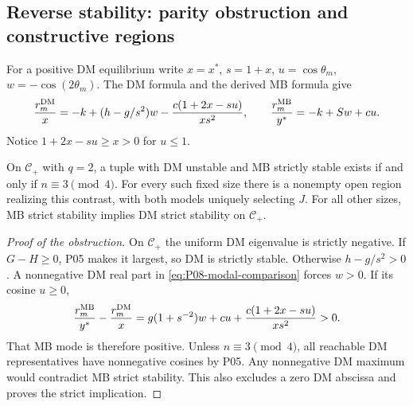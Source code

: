 \subsection{Reverse stability: parity obstruction and constructive regions}
For a positive DM equilibrium write $x=x^*$, $s=1+x$,
$u=\cos\theta_m$, $w=-\cos(2\theta_m)$. The DM formula and
the derived MB formula give
\begin{equation}
 \frac{r_m^{\mathrm{DM}}}x=-k+(h-g/s^2)w
       -\frac{c(1+2x-su)}{xs^2},\qquad
 \frac{r_m^{\mathrm{MB}}}{y^*}=-k+Sw+cu.
 \label{eq:P08-modal-comparison}
\end{equation}
Notice $1+2x-su\ge x>0$ for $u\le1$.
\begin{theorem}
\label{thm:P08-reverse}
On $\mathcal C_+$ with $q=2$, a tuple with DM unstable and MB strictly
stable exists if and only if $n\equiv3\pmod4$. For every such fixed
size there is a nonempty open region realizing this contrast, with both
models uniquely selecting $J$. For all other sizes, MB strict stability
implies DM strict stability on $\mathcal C_+$.
\end{theorem}
\begin{proof}[Proof of the obstruction]
On $\mathcal C_+$ the uniform DM eigenvalue is strictly negative.
If $G-H\ge0$, P05 makes it largest, so DM is strictly stable.
Otherwise $h-g/s^2>0$. A nonnegative DM real part in
\eqref{eq:P08-modal-comparison} forces $w>0$. If its cosine $u\ge0$,
\begin{equation}
 \frac{r_m^{\mathrm{MB}}}{y^*}-\frac{r_m^{\mathrm{DM}}}x
 =g(1+s^{-2})w+cu+\frac{c(1+2x-su)}{xs^2}>0.
 \label{eq:P08-modal-gap}
\end{equation}
That MB mode is therefore positive. Unless $n\equiv3\pmod4$, all
reachable DM representatives have nonnegative cosines by P05. Any
nonnegative DM maximum would contradict MB strict stability. This also
excludes a zero DM abscissa and proves the strict implication.
\end{proof}
